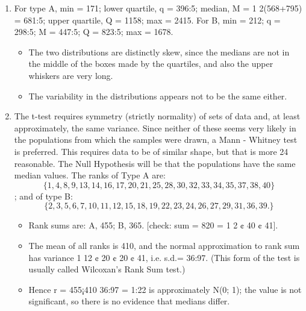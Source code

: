 \documentclass[a4paper,12pt]{article}
\begin{document}
\begin{enumerate}
\item For type A, min = 171; lower quartile, q = 396:5; median, M = 1
2(568+795) =
681:5; upper quartile, Q = 1158; max = 2415.
For B, min = 212; q = 298:5; M = 447:5; Q = 823:5; max = 1678.

\begin{itemize}
\item The two distributions are distinctly skew, since the medians are not in the
middle of the boxes made by the quartiles, and also the upper whiskers are
very long. 
\item The variability in the distributions appears not to be the same
either.
\end{itemize}

\item The t-test requires symmetry (strictly normality) of sets of data and, at least
approximately, the same variance. Since neither of these seems very likely
in the populations from which the samples were drawn, a Mann - Whitney
test is preferred. This requires data to be of similar shape, but that is more
24
reasonable. The Null Hypothesis will be that the populations have the same
median values. The ranks of Type A are: \[\{1, 4, 8, 9, 13, 14, 16, 17, 20, 21,
25, 28, 30, 32, 33, 34, 35, 37, 38, 40\}\]; and of type B: \[\{2, 3, 5, 6, 7, 10, 11, 12,
15, 18, 19, 22, 23, 24, 26, 27, 29, 31, 36, 39.\}\]

\begin{itemize}
\item Rank sums are: A, 455; B, 365. [check: sum = 820 = 1
2 ¢ 40 ¢ 41]. 
\item The mean
of all ranks is 410, and the normal approximation to rank sum has variance
1
12 ¢ 20 ¢ 20 ¢ 41, i.e. s.d.= 36:97.
(This form of the test is usually called Wilcoxan’s Rank Sum test.)
\item Hence r = 455¡410
36:97 = 1:22 is approximately N(0; 1); the value is not significant,
so there is no evidence that medians differ.
\end{itemize}
\end{enumerate}
\end{document}
